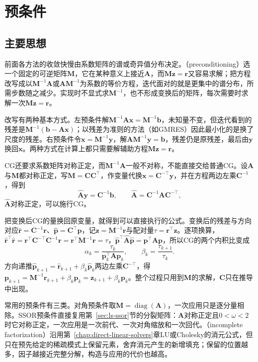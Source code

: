 \section{预条件}
\label{sec:ls-preconditioning}

\subsection{主要思想}

前面各方法的收敛快慢由系数矩阵的谱或奇异值分布决定。（preconditioning）选一个固定的可逆矩阵$\bm M$，它在某种意义上接近$\bm A$，而$\bm M\bm z=\bm r$又容易求解；把方程改写成以$\bm M^{-1}\bm A$或$\bm A\bm M^{-1}$为系数的等价方程，迭代面对的就是更集中的谱分布，所需步数随之减少。实现时不显式求$\bm M^{-1}$，也不形成变换后的矩阵，每次需要时求解一次$\bm M\bm z=\bm r$。

改写有两种基本方式。左预条件解$\bm M^{-1}\bm A\bm x=\bm M^{-1}\bm b$，未知量不变，但迭代看到的残差是$\bm M^{-1}(\bm b-\bm A\bm x)$；以残差为准则的方法（如GMRES）因此最小化的是换了尺度的残差。右预条件令$\bm x=\bm M^{-1}\bm y$，解$\bm A\bm M^{-1}\bm y=\bm b$，残差仍是原残差，最后由$\bm y$换回$\bm x$。两种方式在计算上都只需要解辅助方程$\bm M\bm z=\bm r$。

CG还要求系数矩阵对称正定，而$\bm M^{-1}\bm A$一般不对称，不能直接交给普通CG。设$\bm A$与$\bm M$都对称正定，写$\bm M=\bm C\bm C^\top$，作变量代换$\bm x=\bm C^{-\top}\bm y$，并在方程两边左乘$\bm C^{-1}$，得到
\[
 \widehat{\bm A}\bm y=\bm C^{-1}\bm b,\qquad \widehat{\bm A}=\bm C^{-1}\bm A\bm C^{-\top},
\]
$\widehat{\bm A}$对称正定，可以施行CG。

把变换后CG的量换回原变量，就得到可以直接执行的公式。变换后的残差与方向对应$\hat{\bm r}=\bm C^{-1}\bm r$、$\hat{\bm p}=\bm C^\top\bm p$，记$\bm z=\bm M^{-1}\bm r$与配对量$\tau=\bm r^\top\bm z$。逐项换算，$\hat{\bm r}^\top\hat{\bm r}=\bm r^\top\bm C^{-\top}\bm C^{-1}\bm r=\bm r^\top\bm M^{-1}\bm r=\tau$，$\hat{\bm p}^\top\widehat{\bm A}\hat{\bm p}=\bm p^\top\bm A\bm p$，所以CG的两个内积比变成
\[
 \alpha_k=\frac{\tau_k}{\bm p_k^\top\bm A\bm p_k},\qquad \beta_k=\frac{\tau_{k+1}}{\tau_k}.
\]
方向递推$\hat{\bm p}_{k+1}=\hat{\bm r}_{k+1}+\beta_k\hat{\bm p}_k$两边左乘$\bm C^{-\top}$，得$\bm p_{k+1}=\bm M^{-1}\bm r_{k+1}+\beta_k\bm p_k=\bm z_{k+1}+\beta_k\bm p_k$。整个过程只用到$\bm M$的求解，$\bm C$只在推导中出现。

常用的预条件有三类。对角预条件取$\bm M=\operatorname{diag}(\bm A)$，一次应用只是逐分量相除。SSOR预条件直接复用第~\ref{sec:ls-ssor}节的分裂矩阵：$\bm A$对称正定且$0<\omega<2$时它对称正定，一次应用是一次前代、一次对角缩放和一次回代。（incomplete factorization）沿用第~\ref{chap:direct-linear-solvers}章LU或Cholesky的消元公式，但只在预先给定的稀疏模式上保留元素，舍弃消元产生的新增填充；保留的位置越多，因子越接近完整分解，构造与应用的代价也越高。

